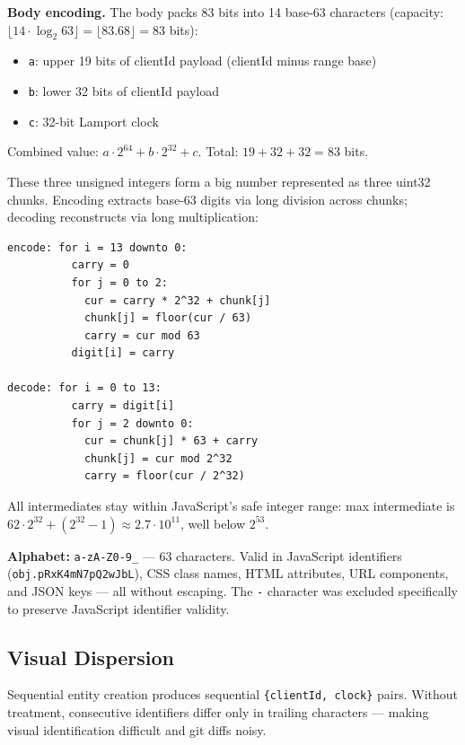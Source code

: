 \textbf{Body encoding.} The body packs 83 bits into 14 base-63 characters (capacity: $\lfloor 14 \cdot \log_2 63 \rfloor = \lfloor 83.68 \rfloor = 83$ bits):

\begin{itemize}
    \item \texttt{a}: upper 19 bits of clientId payload (clientId minus range base)
    \item \texttt{b}: lower 32 bits of clientId payload
    \item \texttt{c}: 32-bit Lamport clock
\end{itemize}

Combined value: $a \cdot 2^{64} + b \cdot 2^{32} + c$. Total: $19 + 32 + 32 = 83$ bits.

These three unsigned integers form a big number represented as three uint32 chunks. Encoding extracts base-63 digits via long division across chunks; decoding reconstructs via long multiplication:

\begin{lstlisting}
encode: for i = 13 downto 0:
          carry = 0
          for j = 0 to 2:
            cur = carry * 2^32 + chunk[j]
            chunk[j] = floor(cur / 63)
            carry = cur mod 63
          digit[i] = carry

decode: for i = 0 to 13:
          carry = digit[i]
          for j = 2 downto 0:
            cur = chunk[j] * 63 + carry
            chunk[j] = cur mod 2^32
            carry = floor(cur / 2^32)
\end{lstlisting}

All intermediates stay within JavaScript's safe integer range: max intermediate is $62 \cdot 2^{32} + (2^{32} - 1) \approx 2.7 \cdot 10^{11}$, well below $2^{53}$.

\textbf{Alphabet:} \texttt{a-zA-Z0-9\_} --- 63 characters. Valid in JavaScript identifiers (\texttt{obj.pRxK4mN7pQ2wJbL}), CSS class names, HTML attributes, URL components, and JSON keys --- all without escaping. The \texttt{-} character was excluded specifically to preserve JavaScript identifier validity.

\subsection{Visual Dispersion}

Sequential entity creation produces sequential \texttt{\{clientId, clock\}} pairs. Without treatment, consecutive identifiers differ only in trailing characters --- making visual identification difficult and git diffs noisy.

